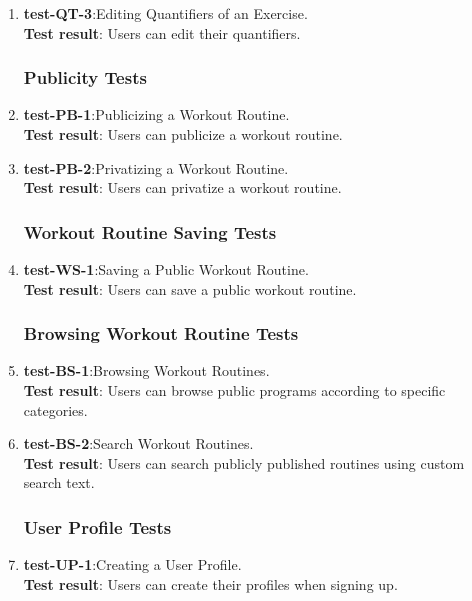 \documentclass[12pt, titlepage]{article}
\begin{document}
\begin{enumerate}
    \item{\textbf{test-QT-3}}:Editing Quantifiers of an Exercise.\\
    \textbf{Test result}: Users can edit their quantifiers.
   
\subsubsection{Publicity Tests}
    \item{\textbf{test-PB-1}}:Publicizing a Workout Routine.\\
    \textbf{Test result}: Users can publicize a workout routine.
   
    \item{\textbf{test-PB-2}}:Privatizing a Workout Routine.\\
    \textbf{Test result}: Users can privatize a workout routine.
   
\subsubsection{Workout Routine Saving Tests}
    \item{\textbf{test-WS-1}}:Saving a Public Workout Routine.\\
    \textbf{Test result}: Users can save a public workout routine.
   
\subsubsection{Browsing Workout Routine Tests}
    \item{\textbf{test-BS-1}}:Browsing Workout Routines.\\
    \textbf{Test result}: Users can browse public programs according to specific categories.
   
    \item{\textbf{test-BS-2}}:Search Workout Routines.\\
    \textbf{Test result}: Users can search publicly published routines using custom search text.
   
\subsubsection{User Profile Tests}
    \item{\textbf{test-UP-1}}:Creating a User Profile.\\
    \textbf{Test result}: Users can create their profiles when signing up.
   

\end{enumerate}
\end{document}
